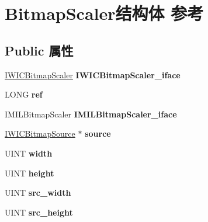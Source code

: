 \hypertarget{struct_bitmap_scaler}{}\section{Bitmap\+Scaler结构体 参考}
\label{struct_bitmap_scaler}
\subsection*{Public 属性}
\begin{DoxyCompactItemize}
\item 
\mbox{\label{struct_bitmap_scaler_a8adf8a449f202734ebf1a9764d0e82d9}} 
\hyperlink{interface_i_w_i_c_bitmap_scaler}{I\+W\+I\+C\+Bitmap\+Scaler} {\bfseries I\+W\+I\+C\+Bitmap\+Scaler\+\_\+iface}
\item 
\mbox{\label{struct_bitmap_scaler_a46560112fad32b9743180f0c7e62234d}} 
L\+O\+NG {\bfseries ref}
\item 
\mbox{\label{struct_bitmap_scaler_a15b977e46c38e1383be9a668b8b93dc2}} 
I\+M\+I\+L\+Bitmap\+Scaler {\bfseries I\+M\+I\+L\+Bitmap\+Scaler\+\_\+iface}
\item 
\mbox{\label{struct_bitmap_scaler_af5f25b0173d15ef7234c30645c685f01}} 
\hyperlink{interface_i_w_i_c_bitmap_source}{I\+W\+I\+C\+Bitmap\+Source} $\ast$ {\bfseries source}
\item 
\mbox{\label{struct_bitmap_scaler_a4c6ca3c5574c0b666f71362c77927b43}} 
U\+I\+NT {\bfseries width}
\item 
\mbox{\label{struct_bitmap_scaler_a9bd2b4a138c4cc2347fda4f8656e6817}} 
U\+I\+NT {\bfseries height}
\item 
\mbox{\label{struct_bitmap_scaler_a2220c7c2fa0e9632ce8725b9fb8dd3d4}} 
U\+I\+NT {\bfseries src\+\_\+width}
\item 
\mbox{\label{struct_bitmap_scaler_a46455c60ed48899682b40134dcbe26f7}} 
U\+I\+NT {\bfseries src\+\_\+height}
\item 
\mbox{\label{struct_bitmap_scaler_a25244c95e475b817f9d191ac5e34608e}} 

\end{DoxyCompactItemize}
